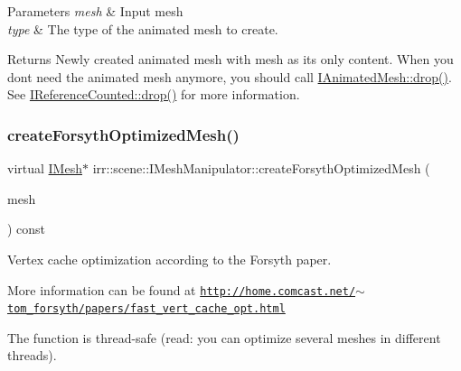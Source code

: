 \begin{DoxyParams}{Parameters}
{\em mesh} & Input mesh \\
\hline
{\em type} & The type of the animated mesh to create. \\
\hline
\end{DoxyParams}
\begin{DoxyReturn}{Returns}
Newly created animated mesh with mesh as its only content. When you don\textquotesingle{}t need the animated mesh anymore, you should call \hyperlink{classirr_1_1IReferenceCounted_a03856a09355b89d178090c4a5f738543}{I\+Animated\+Mesh\+::drop()}. See \hyperlink{classirr_1_1IReferenceCounted_a03856a09355b89d178090c4a5f738543}{I\+Reference\+Counted\+::drop()} for more information. 
\end{DoxyReturn}
\mbox{\label{classirr_1_1scene_1_1IMeshManipulator_a5003ca5eabee96fe1c871bdb25ae43fd}} 
\subsubsection{\texorpdfstring{create\+Forsyth\+Optimized\+Mesh()}{createForsythOptimizedMesh()}}
{\footnotesize\ttfamily virtual \hyperlink{classirr_1_1scene_1_1IMesh}{I\+Mesh}$\ast$ irr\+::scene\+::\+I\+Mesh\+Manipulator\+::create\+Forsyth\+Optimized\+Mesh (\begin{DoxyParamCaption}\item[{const \hyperlink{classirr_1_1scene_1_1IMesh}{I\+Mesh} $\ast$}]{mesh }\end{DoxyParamCaption}) const\hspace{0.3cm}{\ttfamily [pure virtual]}}



Vertex cache optimization according to the Forsyth paper. 

More information can be found at \href{http://home.comcast.net/~tom_forsyth/papers/fast_vert_cache_opt.html}{\tt http\+://home.\+comcast.\+net/$\sim$tom\+\_\+forsyth/papers/fast\+\_\+vert\+\_\+cache\+\_\+opt.\+html}

The function is thread-\/safe (read\+: you can optimize several meshes in different threads).


